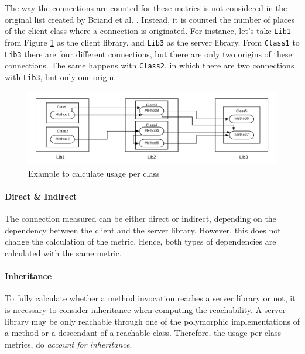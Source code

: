 The way the connections are counted for these metrics is not considered in the original list created by Briand et al. \cite{briand1999unified}. Instead, it is counted the number of places of the client class where a connection is originated. For instance, let's take \texttt{Lib1} from Figure \ref{fig:example-impact-per-class} as the client library, and \texttt{Lib3} as the server library. From \texttt{Class1} to \texttt{Lib3} there are four different connections, but there are only two origins of these connections. The same happens with \texttt{Class2}, in which there are two connections with \texttt{Lib3}, but only one origin.

\begin{figure}[ht]
\begin{center}
\includegraphics[width=\textwidth]{figures/impact-per-class.png}
\caption{Example to calculate usage per class}
\label{fig:example-impact-per-class}
\end{center}
\end{figure}

\paragraph{Direct \& Indirect}

The connection measured can be either direct or indirect, depending on the dependency between the client and the server library. However, this does not change the calculation of the metric. Hence, both types of dependencies are calculated with the same metric.

\paragraph{Inheritance}

To fully calculate whether a method invocation reaches a server library or not, it is necessary to consider inheritance when computing the reachability. A server library may be only reachable through one of the polymorphic implementations of a method or a descendant of a reachable class. Therefore, the usage per class metrics, do \textit{account for inheritance}.

